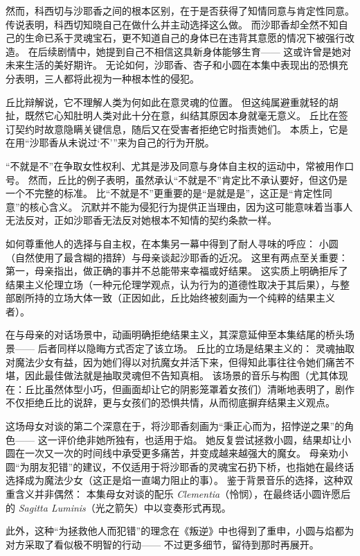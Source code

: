 然而，科西切与沙耶香之间的根本区别，在于是否获得了知情同意与肯定性同意。
传说表明，科西切知晓自己在做什么并主动选择这么做。
而沙耶香却全然不知自己的生命已系于灵魂宝石，更不知道自己的身体已在违背其意愿的情况下被强行改造。
在后续剧情中，她提到自己不相信这具新身体能够生育——
这或许曾是她对未来生活的美好期许。
无论如何，沙耶香、杏子和小圆在本集中表现出的恐惧充分表明，三人都将此视为一种根本性的侵犯。

丘比辩解说，它不理解人类为何如此在意灵魂的位置。
但这纯属避重就轻的胡扯，既然它心知肚明人类对此十分在意，纠结其原因本身就毫无意义。
丘比在签订契约时故意隐瞒关键信息，随后又在受害者拒绝它时指责她们。
本质上，它是在用“沙耶香从未说过‘不’”来为自己的行为开脱。

“不就是不”在争取女性权利、尤其是涉及同意与身体自主权的运动中，常被用作口号\cite{caringella2009affirmative-consent}。
然而，丘比的例子表明，虽然承认“不就是不”肯定比不承认要好，但这仍是一个不完整的标准。
比“不就是不”更重要的是“是就是是”，这正是“肯定性同意”的核心含义\cite{caringella2009affirmative-consent}。
沉默并不能为侵犯行为提供正当理由，因为这可能意味着当事人无法反对，正如沙耶香无法反对她根本不知情的契约条款一样。

如何尊重他人的选择与自主权，在本集另一幕中得到了耐人寻味的呼应：
小圆（自然使用了最含糊的措辞）与母亲谈起沙耶香的近况。
这里有两点至关重要：
第一，母亲指出，做正确的事并不总能带来幸福或好结果。
这实质上明确拒斥了结果主义伦理立场（一种元伦理学观点，认为行为的道德性取决于其后果\cite{sinnott-armstrong-nodate-consequentialism}），与整部剧所持的立场大体一致（正因如此，丘比始终被刻画为一个纯粹的结果主义者）。

在与母亲的对话场景中，动画明确拒绝结果主义，其深意延伸至本集结尾的桥头场景——
后者同样以隐晦方式否定了该立场。
丘比的立场是结果主义的：
灵魂抽取对魔法少女有益，因为她们得以对抗魔女并活下来，但得知此事往往令她们痛苦不堪，因此最佳做法就是抽取灵魂但不告知真相。
该场景的音乐与构图（尤其体现在：丘比虽然体型小巧，但画面却让它的阴影笼罩着女孩们）清晰地表明了，剧作不仅拒绝丘比的说辞，更与女孩们的恐惧共情，从而彻底摒弃结果主义观点。

这场母女对谈的第二个深意在于，将沙耶香刻画为“秉正心而为，招悖逆之果”的角色——
这一评价绝非她所独有，也适用于焰。
她反复尝试拯救小圆，结果却让小圆在一次又一次的时间线中承受更多痛苦，并变成越来越强大的魔女。
母亲劝小圆“为朋友犯错”的建议，不仅适用于将沙耶香的灵魂宝石扔下桥，也指她在最终话选择成为魔法少女（这正是焰一直竭力阻止的事）。
鉴于背景音乐的选择，这种双重含义并非偶然：
本集母女对谈的配乐 \emph{Clementia}（怜悯），在最终话小圆许愿后的 \emph{Sagitta Luminis}（光之箭矢）中以变奏形式再现。

此外，这种“为拯救他人而犯错”的理念在《叛逆》中也得到了重申，小圆与焰都为对方采取了看似极不明智的行动——
不过更多细节，留待到那时再展开。
